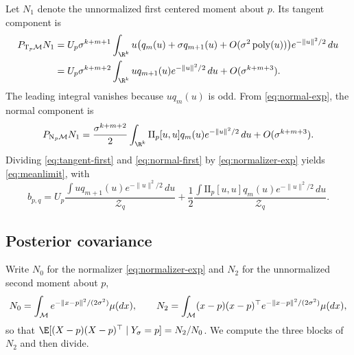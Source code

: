 Let $N_1$ denote the unnormalized first centered moment about $p$.  Its tangent component is
\begin{align}
  P_{\T_p\M}N_1
  &=
  U_p\sigma^{k+m+1}
  \int_{\R^k}u
  \bigl(q_m(u)+\sigma q_{m+1}(u)+O(\sigma^2\operatorname{poly}(u))\bigr)
  e^{-\|u\|^2/2}\,du\nonumber\\
  &=
  U_p\sigma^{k+m+2}
  \int_{\R^k}u q_{m+1}(u)e^{-\|u\|^2/2}\,du
  +O(\sigma^{k+m+3}).
  \label{eq:tangent-first}
\end{align}
The leading integral vanishes because $u q_m(u)$ is odd.  From \eqref{eq:normal-exp}, the normal component is
\begin{equation}
  P_{\N_p\M}N_1
  =
  \frac{\sigma^{k+m+2}}{2}
  \int_{\R^k}\mathrm{II}_p[u,u]q_m(u)e^{-\|u\|^2/2}\,du
  +O(\sigma^{k+m+3}).
  \label{eq:normal-first}
\end{equation}
Dividing \eqref{eq:tangent-first} and \eqref{eq:normal-first} by \eqref{eq:normalizer-exp} yields \eqref{eq:meanlimit}, with
\begin{equation}
  b_{p,q}
  =
  U_p\frac{\int u q_{m+1}(u)e^{-\|u\|^2/2}\,du}{\mathcal Z_q}
  +\frac12
  \frac{\int \mathrm{II}_p[u,u]q_m(u)e^{-\|u\|^2/2}\,du}{\mathcal Z_q}.
  \label{eq:b-explicit}
\end{equation}

\subsection{Posterior covariance}

Write $N_0$ for the normalizer \eqref{eq:normalizer-exp} and $N_2$ for the
unnormalized second moment about $p$,
\begin{equation}
  N_0=\int_{\mathcal{M}} e^{-\|x-p\|^2/(2\sigma^2)}\mu(dx),
  \qquad
  N_2=\int_{\mathcal{M}}(x-p)(x-p)^\top e^{-\|x-p\|^2/(2\sigma^2)}\mu(dx),
  \label{eq:n0-n2}
\end{equation}
so that $\E[(X-p)(X-p)^\top\mid Y_\sigma=p]=N_2/N_0$.  We compute the three
blocks of $N_2$ and then divide.

